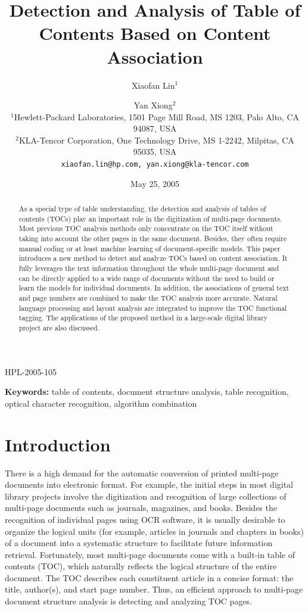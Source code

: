 \documentclass[10pt]{article}
\title{Detection and Analysis of Table of Contents Based on Content Association}
\author{Xiaofan Lin$^{1}$ \and Yan Xiong$^{2}$ \\
$^{1}$Hewlett-Packard Laboratories, 1501 Page Mill Road, MS 1203, Palo Alto, CA 94087, USA \\
$^{2}$KLA-Tencor Corporation, One Technology Drive, MS 1-2242, Milpitas, CA 95035, USA \\
\texttt{xiaofan.lin@hp.com, yan.xiong@kla-tencor.com}}
\date{May 25, 2005}
\begin{document}
\maketitle

\begin{center}
HPL-2005-105
\end{center}

\begin{abstract}
As a special type of table understanding, the detection and analysis of tables of contents (TOCs) play an important role in the digitization of multi-page documents. Most previous TOC analysis methods only concentrate on the TOC itself without taking into account the other pages in the same document. Besides, they often require manual coding or at least machine learning of document-specific models. This paper introduces a new method to detect and analyze TOCs based on content association. It fully leverages the text information throughout the whole multi-page document and can be directly applied to a wide range of documents without the need to build or learn the models for individual documents. In addition, the associations of general text and page numbers are combined to make the TOC analysis more accurate. Natural language processing and layout analysis are integrated to improve the TOC functional tagging. The applications of the proposed method in a large-scale digital library project are also discussed.
\end{abstract}

\noindent \textbf{Keywords:} table of contents, document structure analysis, table recognition, optical character recognition, algorithm combination

\section{Introduction}
There is a high demand for the automatic conversion of printed multi-page documents into electronic format. For example, the initial steps in most digital library projects involve the digitization and recognition of large collections of multi-page documents such as journals, magazines, and books. Besides the recognition of individual pages using OCR software, it is usually desirable to organize the logical units (for example, articles in journals and chapters in books) of a document into a systematic structure to facilitate future information retrieval. Fortunately, most multi-page documents come with a built-in table of contents (TOC), which naturally reflects the logical structure of the entire document. The TOC describes each constituent article in a concise format: the title, author(s), and start page number. Thus, an efficient approach to multi-page document structure analysis is detecting and analyzing TOC pages.
\end{document}
